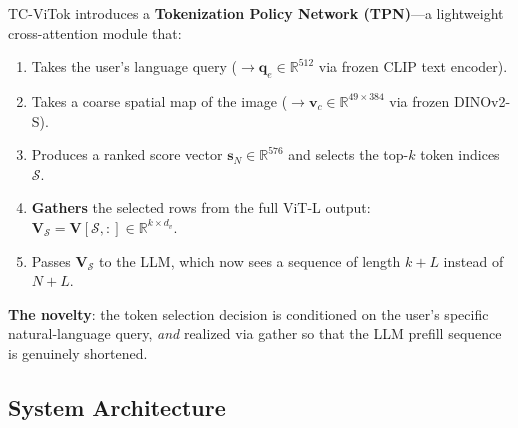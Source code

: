 \documentclass[11pt,a4paper]{article}
\newcommand{\R}{\mathbb{R}}
\newcommand{\vc}{\mathbf{v}_c}
\newcommand{\qe}{\mathbf{q}_e}
\newcommand{\vs}{\mathbf{s}}
\newcommand{\mV}{\mathbf{V}}
\begin{document}
TC-ViTok introduces a \textbf{Tokenization Policy Network (TPN)}---a
lightweight cross-attention module that:
\begin{enumerate}[leftmargin=1.5em, itemsep=2pt]
  \item Takes the user's language query
    ($\to \qe \in \R^{512}$ via frozen CLIP text encoder).
  \item Takes a coarse spatial map of the image
    ($\to \vc \in \R^{49 \times 384}$ via frozen DINOv2-S).
  \item Produces a ranked score vector $\vs_N \in \R^{576}$ and selects
    the top-$k$ token indices $\mathcal{S}$.
  \item \textbf{Gathers} the selected rows from the full ViT-L output:
    $\mV_\mathcal{S} = \mV[\mathcal{S},:] \in \R^{k \times d_v}$.
  \item Passes $\mV_\mathcal{S}$ to the LLM, which now sees a sequence
    of length $k{+}L$ instead of $N{+}L$.
\end{enumerate}

\textbf{The novelty}: the token selection decision is conditioned on the
user's specific natural-language query, \emph{and} realized via gather
so that the LLM prefill sequence is genuinely shortened.

\subsection{System Architecture}
\end{document}
